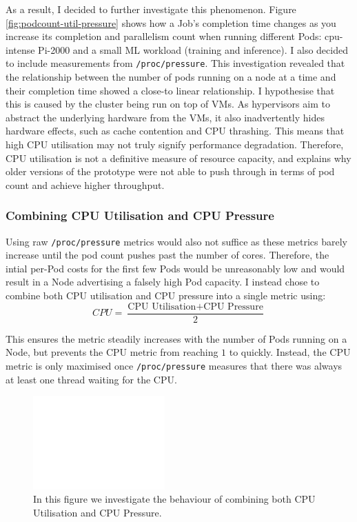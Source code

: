 As a result, I decided to further investigate this phenomenon. Figure
\ref{fig:podcount-util-pressure} shows how a Job's completion time changes as you
increase its completion and parallelism count when running different Pods:
cpu-intense Pi-2000 and a small ML workload (training and inference). I also
decided to include measurements from \verb|/proc/pressure|. This investigation
revealed that the relationship between the number of pods running on
a node at a time and their completion time showed a close-to linear
relationship. I hypothesise that this is caused by the cluster being run on top
of VMs. As hypervisors aim to abstract the underlying hardware from the VMs, it
also inadvertently hides hardware effects, such as cache contention and CPU
thrashing. This means that high  CPU utilisation may not truly signify
performance degradation. Therefore, CPU utilisation is not a definitive measure
of resource capacity, and explains why older versions of the  prototype were not
able to push through in terms of pod count and achieve higher throughput.

\subsubsection{Combining CPU Utilisation and CPU Pressure}
Using raw \verb|/proc/pressure| metrics would also not suffice as these metrics
barely increase until the pod count pushes past the number of cores. Therefore,
the intial per-Pod costs for the first few Pods would be unreasonably low and
would result in a Node advertising a falsely high Pod capacity. I instead chose
to combine both CPU utilisation and CPU pressure into a single metric using:
\[ CPU = \frac{\text{CPU Utilisation} + \text{CPU Pressure}}{2} \]

This ensures the metric steadily increases with the number of Pods running on a
Node, but prevents the CPU metric from reaching $1$ to quickly. Instead, the CPU
metric is only maximised once \verb|/proc/pressure| measures that there was
always at least one thread waiting for the CPU.

\begin{figure}[H]
    \centering
    \includegraphics[width=0.45\textwidth]{images/blank.pdf}
    \caption{In this figure we investigate the behaviour of combining both CPU
    Utilisation and CPU Pressure.}
    \label{fig:combine-cpu-pressure}
\end{figure}

